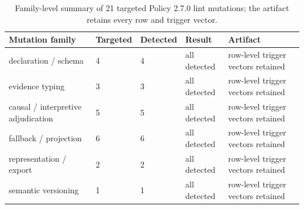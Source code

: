 \begin{table}[t]
  \caption{Family-level summary of 21 targeted Policy 2.7.0 lint mutations; the artifact retains every row and trigger vector.}
  \label{tab:policy-lint-mutations}
  \centering
  \scriptsize
  \begin{tabular}{@{}p{}p{}p{}p{}p{}@{}}
    \toprule
    Mutation family & Targeted & Detected & Result & Artifact \\
    \midrule
    declaration / schema & 4 & 4 & all detected & row-level trigger vectors retained \\
    evidence typing & 3 & 3 & all detected & row-level trigger vectors retained \\
    causal / interpretive adjudication & 5 & 5 & all detected & row-level trigger vectors retained \\
    fallback / projection & 6 & 6 & all detected & row-level trigger vectors retained \\
    representation / export & 2 & 2 & all detected & row-level trigger vectors retained \\
    semantic versioning & 1 & 1 & all detected & row-level trigger vectors retained \\
    \bottomrule
  \end{tabular}
\end{table}
